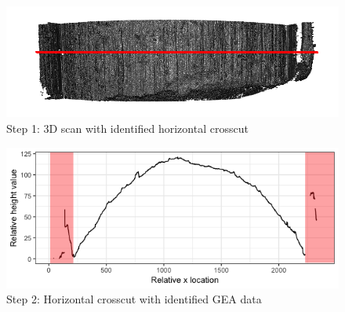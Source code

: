 \documentclass[12pt]{article}
\begin{document}
\begin{figure}
\begin{minipage}[b]{0.45\linewidth}
    \raggedleft
    \includegraphics[width=\textwidth]{images/3d_plot_top_crosscut}
    \centering
    Step 1: 3D scan with identified horizontal crosscut
\end{minipage}
\hspace{.5cm}
\begin{minipage}[b]{0.45\linewidth}
    \raggedright
    \includegraphics[width=\textwidth]{images/profile_paper}
    \centering
    Step 2: Horizontal crosscut with identified GEA data
\end{minipage}\\


\end{figure}
\end{document}
